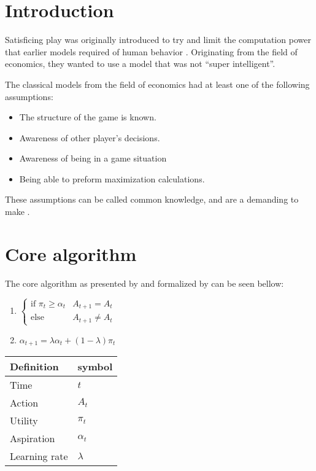
\section{Introduction}

Satisficing play was originally introduced
to try and limit the computation power that earlier models required of human
behavior \citep{herbert}. Originating from the field of economics, they
wanted to use a model that was not ``super intelligent''.

The classical models from the field of economics had at least one of the
following assumptions:

\begin{itemize}
\itemsep0em 
  \item The structure of the game is known.
  \item Awareness of other player's decisions.
  \item Awareness of being in a game situation
  \item Being able to preform maximization calculations.
\end{itemize}

These assumptions can be called common knowledge, and are a demanding to
make \citep{binmore}. 

\section{Core algorithm}
The core algorithm as presented by \citep{herbert} and formalized by
\citep{karandikar}
can be seen bellow:

\begin{enumerate}
  \item $ \begin{cases}
              \text{if } \pi_t \geq \alpha_t & A_{t+1} = A_t\\
              \text{else} & A_{t+1} \neq A_t
              \end{cases}$
  \item $ \alpha_{t+1} = \lambda \alpha_t + (1-\lambda) \pi_t $ \\
\end{enumerate}
\begin{tabular}{ll}
  Definition & symbol \\ \toprule
  Time & $t$ \\
  Action & $A_t$ \\
  Utility & $\pi_t$ \\
  Aspiration & $\alpha_t$ \\
  Learning rate & $\lambda$ \\ \bottomrule
\end{tabular}

